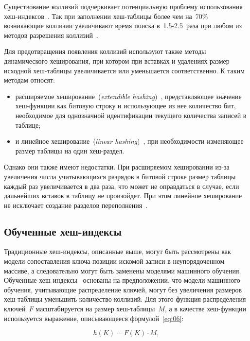 Существование коллизий подчеркивает потенциальную проблему использования
хеш-индексов~\cite{squares}. Так при заполнении хеш-таблицы более чем на~$70\%$
возникающие коллизии увеличивают время поиска в~1.5-2.5~раза при любом из
методов разрешения коллизий~\cite{baw}.

Для предотвращения появления коллизий используют также методы динамического
хеширования, при котором при вставках и удалениях размер исходной хеш-таблицы
увеличивается или уменьшается соответственно. К таким методам относят:
\begin{itemize}
    \item расширяемое хеширование~(\textit{extendible hashing})~\cite{encycl},
        представляющее значение хеш-функции как битовую строку и использующее из
        нее количество бит, необходимое для однозначной идентификации текущего
        количества записей в таблице;
    \item и линейное хеширование~(\textit{linear hashing})~\cite{encycl}, при
        необходимости изменяющее размер таблицы на один хеш-раздел.
\end{itemize}

Однако они также имеют недостатки. При расширяемом хешировании из-за увеличения
числа учитывающихся разрядов в битовой строке размер таблицы каждый раз
увеличивается в два раза, что может не оправдаться в случае, если дальнейших
вставок в таблицу не произойдет. При этом линейное хеширование не исключает
создание разделов переполнения~\cite{encycl}.

\subsection{Обученные хеш-индексы}

Традиционные хеш-индексы, описанные выше, могут быть рассмотрены как модели
сопоставления ключа позиции искомой записи в неупорядоченном массиве, а
следовательно могут быть заменены моделями машинного обучения.  Обученные
хеш-индексы~\cite{main} основаны на предположении, что модели машинного
обучения, учитывающие распределение ключей, могут без увеличения размеров
хеш-таблицы уменьшить количество коллизий. Для этого функция распределения
ключей~$F$ масштабируется на размер хеш-таблицы~$M$, а в качестве хеш-функции
используется выражение, описывающееся формулой~\eqref{eq:06}:

\begin{equation}\label{eq:06}
    h(K) = F(K) \cdot M,
\end{equation}

